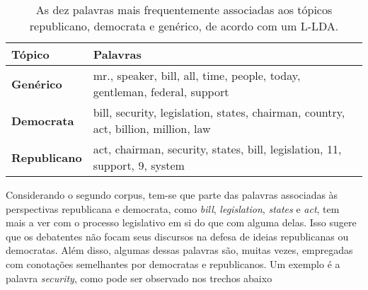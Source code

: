 
\begin{table}[h]
\label{freqs:tab2}
\centering
\begin{tabular}{| l | p{10cm} | }
\hline
\textbf{Tópico} & \textbf{Palavras} \\ \hline
\textbf{Genérico} & mr., speaker, bill, all, time, people, today, gentleman, federal, support \\ \hline
\textbf{Democrata} & bill, security, legislation, states, chairman, country, act, billion, million, law \\ \hline
\textbf{Republicano} & act, chairman, security, states, bill, legislation, 11, support, 9, system \\ \hline
\end{tabular}
\caption{As dez palavras mais frequentemente associadas aos tópicos republicano, democrata e genérico, de acordo com um L-LDA.}
\end{table}



Considerando o segundo corpus, tem-se que parte das palavras associadas às perspectivas republicana e democrata, como \emph{bill}, \emph{legislation}, \emph{states} e \emph{act}, tem mais a ver com o processo legislativo em si do que com alguma delas. Isso sugere que os debatentes não focam seus discursos na defesa de ideias republicanas ou democratas. Além disso, algumas dessas palavras são, muitas vezes, empregadas com conotações semelhantes por democratas e republicanos. Um exemplo é a palavra \emph{security}, como pode ser observado nos trechos abaixo

